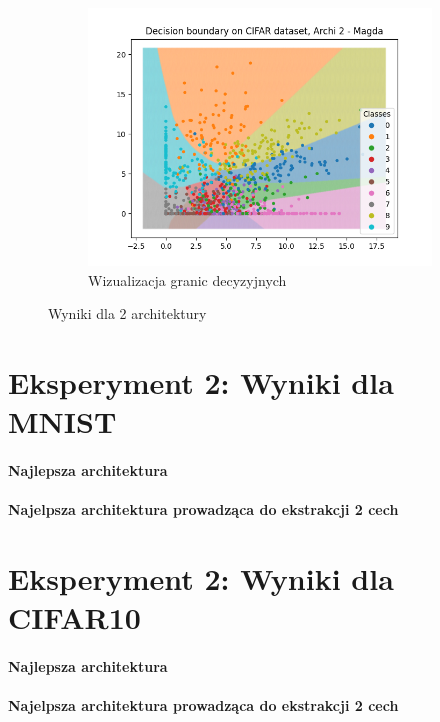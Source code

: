 \documentclass[10pt]{article}
\begin{document}
\begin{figure}[H]
\begin{subfigure}[b]{.19\textwidth}
        \includegraphics[width=\linewidth]{img/magda/Cifar_small_decision}
        \caption{Wizualizacja granic decyzyjnych}
    \end{subfigure}
    \caption{Wyniki dla 2 architektury}
    \label{fig:exp1_magda_cifar2}
\end{figure}

\pagebreak
\section{Eksperyment 2: Wyniki dla MNIST}\label{sec:ex2_mnist}

\paragraph{Najlepsza architektura}
\paragraph{Najelpsza architektura prowadząca do ekstrakcji 2 cech}

\pagebreak
\section{Eksperyment 2: Wyniki dla CIFAR10}\label{sec:ex2_cifar}

\paragraph{Najlepsza architektura}
\paragraph{Najelpsza architektura prowadząca do ekstrakcji 2 cech}
\end{document}
